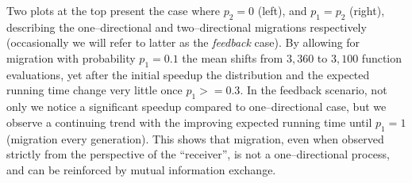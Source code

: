 \documentclass{sig-alternate}
\begin{document}
Two plots at the top present the case where $p_2 = 0$ (left), and $p_1 = p_2$ (right), describing the one--directional and two--directional migrations respectively (occasionally we will refer to latter as the \emph{feedback} case).
By allowing for migration with probability $p_1 = 0.1$ the mean shifts from $3,360$ to $3,100$ function evaluations, yet after the initial speedup the distribution and the expected running time change very little once $p_1 >= 0.3$.
In the feedback scenario, not only we notice a significant speedup compared to one--directional case, but we observe a continuing trend with the improving expected running time until $p_1 = 1$ (migration every generation).
This shows that migration, even when observed strictly from the perspective of the ``receiver'', is not a one--directional process, and can be reinforced by mutual information exchange.
\end{document}
